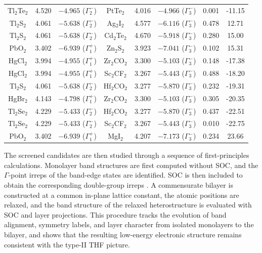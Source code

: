 \documentclass[aps, preprint, prb,]{revtex4-2}
\begin{document}
\begin{table}[htbp]
{\begin{tabular}{c c c c c c c c}
Tl$_2$Te$_2$ & 4.520 & $-4.965$ ($\Gamma_2^-$) & PtTe$_2$     & 4.016 & $-4.966$ ($\Gamma_3^-$) & 0.001 & -11.15 \\
Tl$_2$S$_2$  & 4.061 & $-5.638$ ($\Gamma_2^-$) & Ag$_2$I$_2$   & 4.577 & $-6.116$ ($\Gamma_3^-$) & 0.478 & 12.71 \\
Tl$_2$S$_2$  & 4.061 & $-5.638$ ($\Gamma_2^-$) & Cd$_2$Te$_2$  & 4.670 & $-5.918$ ($\Gamma_3^-$) & 0.280 & 15.00 \\
PbO$_2$    & 3.402 & $-6.939$ ($\Gamma_1^+$) & Zn$_2$S$_2$   & 3.923 & $-7.041$ ($\Gamma_3^-$) & 0.102 & 15.31 \\
HgCl$_2$   & 3.994 & $-4.955$ ($\Gamma_1^+$) & Zr$_2$CO$_2$  & 3.300 & $-5.103$ ($\Gamma_3^-$) & 0.148 & -17.38 \\
HgCl$_2$   & 3.994 & $-4.955$ ($\Gamma_1^+$) & Sc$_2$CF$_2$  & 3.267 & $-5.443$ ($\Gamma_3^-$) & 0.488 & -18.20 \\
Tl$_2$S$_2$  & 4.061 & $-5.638$ ($\Gamma_2^-$) & Hf$_2$CO$_2$  & 3.277 & $-5.870$ ($\Gamma_3^-$) & 0.232 & -19.31 \\
HgBr$_2$   & 4.143 & $-4.798$ ($\Gamma_1^+$) & Zr$_2$CO$_2$  & 3.300 & $-5.103$ ($\Gamma_3^-$) & 0.305 & -20.35 \\
Tl$_2$Se$_2$ & 4.229 & $-5.433$ ($\Gamma_2^-$) & Hf$_2$CO$_2$  & 3.277 & $-5.870$ ($\Gamma_3^-$) & 0.437 & -22.51 \\
Tl$_2$Se$_2$ & 4.229 & $-5.433$ ($\Gamma_2^-$) & Sc$_2$CF$_2$  & 3.267 & $-5.443$ ($\Gamma_3^-$) & 0.010 & -22.75 \\
PbO$_2$    & 3.402 & $-6.939$ ($\Gamma_1^+$) & MgI$_2$      & 4.207 & $-7.173$ ($\Gamma_3^-$) & 0.234 & 23.66 \\
\bottomrule
\end{tabular}%
}
\label{tab:p-3m1}
\end{table}

The screened candidates are then studied through a sequence of first-principles calculations. Monolayer band structures are first computed without SOC, and the $\Gamma$-point irreps of the band-edge states are identified. SOC is then included to obtain the corresponding double-group irreps \cite{Iraola2022IrRep}. A commensurate bilayer is constructed at a common in-plane lattice constant, the atomic positions are relaxed, and the band structure of the relaxed heterostructure is evaluated with SOC and layer projections. This procedure tracks the evolution of band alignment, symmetry labels, and layer character from isolated monolayers to the bilayer, and shows that the resulting low-energy electronic structure remains consistent with the type-II THF picture.
\end{document}
